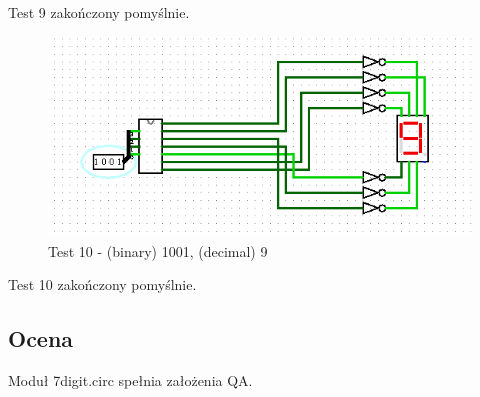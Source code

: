 Test 9 zakończony pomyślnie.

\begin{figure}[H]
    \includegraphics[width=\linewidth]{ScreenshotsTests/Comp 1/Comp 1_00000.png}
    \caption{Test 10 - (binary) 1001, (decimal) 9}
    \label{fig:test9}
\end{figure}

Test 10 zakończony pomyślnie.

\subsection{Ocena}\label{subsec:qa-review}
Moduł 7digit.circ spełnia założenia QA.
